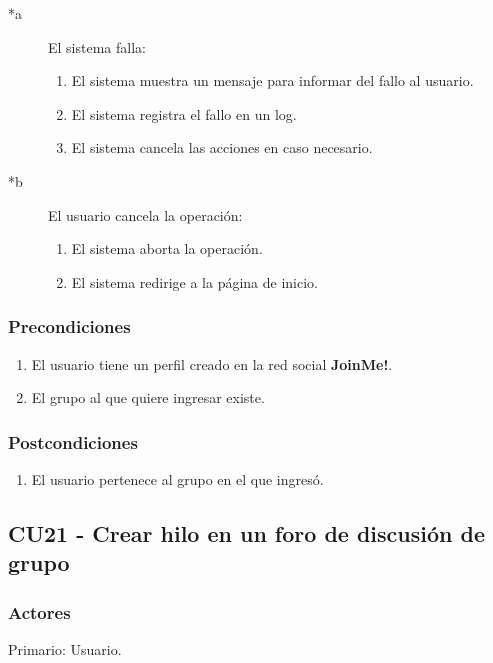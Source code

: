 \documentclass[12pt, a4paper, titlepage]{article}
\begin{document}
	\begin{description}
		\item [*a] El sistema falla:
			\begin{enumerate}
				\item El sistema muestra un mensaje para informar del fallo al usuario.
				\item El sistema registra el fallo en un log.
				\item El sistema cancela las acciones en caso necesario.
			\end{enumerate}
	\end{description}

	\begin{description}
		\item [*b] El usuario cancela la operación:
			\begin{enumerate}
				\item El sistema aborta la operación.
				\item El sistema redirige a la página de inicio.
			\end{enumerate}
	\end{description}
	
\subsubsection{Precondiciones}
	\begin{enumerate}
		\item El usuario tiene un perfil creado en la red social \textbf{JoinMe!}.
		\item El grupo al que quiere ingresar existe.
	\end{enumerate}
\subsubsection{Postcondiciones}
	\begin{enumerate}
		\item El usuario pertenece al grupo en el que ingresó.
	\end{enumerate}


\subsection{CU21 - Crear hilo en un foro de discusión de grupo}
\subsubsection{Actores}
Primario: Usuario.
\end{document}
